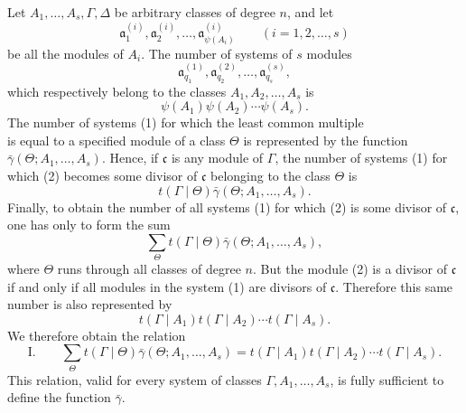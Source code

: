 
Let $A_1,\ldots,A_s,\Gamma,\Delta$ be arbitrary classes of degree $n$, and let
\[
 \mathfrak a^{(i)}_1,\mathfrak a^{(i)}_2,\ldots,
 \mathfrak a^{(i)}_{\psi(A_i)}\qquad (i=1,2,\ldots,s)
\]
be all the modules of $A_i$. The number of systems of $s$ modules
\begin{equation}
 \mathfrak a^{(1)}_{q_1},\mathfrak a^{(2)}_{q_2},\ldots,
 \mathfrak a^{(s)}_{q_s},
\tag{1}
\end{equation}
which respectively belong to the classes $A_1,A_2,\ldots,A_s$ is
\[
 \psi(A_1)\psi(A_2)\cdots\psi(A_s).
\]
The number of systems (1) for which the least common multiple
\begin{equation}
 [\mathfrak a^{(1)}_{q_1},\mathfrak a^{(2)}_{q_2},\ldots,
 \mathfrak a^{(s)}_{q_s}]
\tag{2}
\end{equation}
is equal to a specified module of a class $\Theta$ is represented by the function $\bar\gamma(\Theta;A_1,\ldots,A_s)$. Hence, if $\mathfrak c$ is any module of $\Gamma$, the number of systems (1) for which (2) becomes some divisor of $\mathfrak c$ belonging to the class $\Theta$ is
\[
 t(\Gamma\mid\Theta)\bar\gamma(\Theta;A_1,\ldots,A_s).
\]
Finally, to obtain the number of all systems (1) for which (2) is some divisor of $\mathfrak c$, one has only to form the sum
\[
 \sum_{\Theta}t(\Gamma\mid\Theta)\bar\gamma(\Theta;A_1,\ldots,A_s),
\]
where $\Theta$ runs through all classes of degree $n$. But the module (2) is a divisor of $\mathfrak c$ if and only if all modules in the system (1) are divisors of $\mathfrak c$. Therefore this same number is also represented by
\[
 t(\Gamma\mid A_1)t(\Gamma\mid A_2)\cdots t(\Gamma\mid A_s).
\]
We therefore obtain the relation
\[
\text{I.}\qquad
 \sum_{\Theta}t(\Gamma\mid\Theta)\bar\gamma(\Theta;A_1,\ldots,A_s)
 =t(\Gamma\mid A_1)t(\Gamma\mid A_2)\cdots t(\Gamma\mid A_s).
\]
This relation, valid for every system of classes $\Gamma,A_1,\ldots,A_s$, is fully sufficient to define the function $\bar\gamma$.

